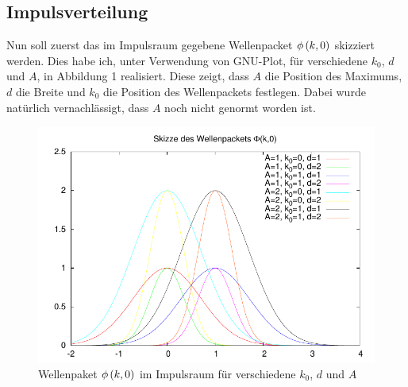 \subsection{Impulsverteilung}
Nun soll zuerst das im Impulsraum gegebene Wellenpacket $\phi\del{k,0}$ skizziert werden. Dies habe ich, unter Verwendung von GNU-Plot, für verschiedene $k_0$, $d$ und $A$, in Abbildung 1 realisiert. Diese zeigt, dass $A$ die Position des Maximums, $d$ die Breite und $k_0$ die Position des Wellenpackets festlegen. Dabei wurde natürlich vernachlässigt, dass $A$ noch nicht genormt worden ist.
\begin{figure}[ht]
	\centering
	\includegraphics[scale=1.3]{Skizze_zu_3_1.pdf}
	\caption{Wellenpaket $\phi\del{k,0}$ im Impulsraum für verschiedene $k_0$, $d$ und $A$}
\end{figure}

